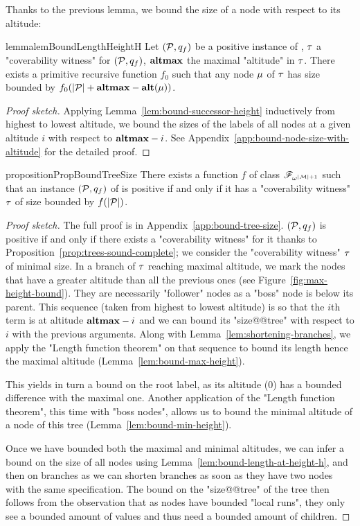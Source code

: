Thanks to the previous lemma, we bound the size of a node with respect to its altitude: 
\begin{restatable}{lemma}{lemBoundLengthHeightH}
	\label{lem:bound-length-at-height-h}
	Let $(\mathcal{P},q_f)$ be a positive instance of \COVER, $\tau$ a "coverability witness" for $(\mathcal{P},q_f)$, $\mathbf{altmax}$ the maximal "altitude" in $\tau$. There exists a primitive recursive function $f_0$ such that any node $\mu$ of $\tau$ has size bounded by $f_0(|\mathcal{P}| + \mathbf{altmax} - \mathbf{alt}(\mu))$.
\end{restatable}
\begin{proof}[Proof sketch]
Applying Lemma~\ref{lem:bound-successor-height} inductively from highest to lowest altitude, we bound the sizes of the labels of all nodes at a given altitude $i$ with respect to $\mathbf{altmax}-i$.
See Appendix~\ref{app:bound-node-size-with-altitude} for the detailed proof. 
\end{proof}
 
\begin{restatable}{proposition}{PropBoundTreeSize}
	\label{prop:bound-tree-size}
	There exists a function $f$ of class $\mathscr{F}_{\omega^{|\mathcal{M}|+1}}$ such that an instance $(\mathcal{P},q_f)$ of \COVER is positive if and only if it has a "coverability witness" $\tau$ of size bounded by $f(|\mathcal{P}|)$.
\end{restatable}

\begin{proof}[Proof sketch]
	The full proof is in Appendix~\ref{app:bound-tree-size}. $(\mathcal{P},q_f)$ is positive if and only if there exists a "coverability witness" for it thanks to Proposition~\ref{prop:trees-sound-complete}; we consider the "coverability witness" $\tau$ of minimal size.
	In a branch of $\tau$ reaching maximal altitude, we mark the nodes that have a greater altitude than all the previous ones (see Figure~\ref{fig:max-height-bound}). They are necessarily "follower" nodes as a "boss" node is below its parent. This sequence (taken from highest to lowest altitude) is so that the $i$th term is at altitude $\mathbf{altmax}-i$ and we can bound its "size@@tree" with respect to $i$ with the previous arguments. Along with Lemma~\ref{lem:shortening-branches}, we apply the "Length function theorem" on that sequence to bound its length hence the maximal altitude (Lemma~\ref{lem:bound-max-height}).
	
	This yields in turn a bound on the root label, as its altitude ($0$) has a bounded difference with the maximal one. Another application of the "Length function theorem", this time with "boss nodes", allows us to bound the minimal altitude of a node of this tree (Lemma~\ref{lem:bound-min-height}).
	
	Once we have bounded both the maximal and minimal altitudes, we can infer a bound on the size of all nodes using Lemma~\ref{lem:bound-length-at-height-h}, and then on branches as we can shorten branches as soon as they have two nodes with the same specification.
	The bound on the "size@@tree" of the tree then follows from the observation that as nodes have bounded "local runs", they only see a bounded amount of values and thus need a bounded amount of children. 
\end{proof}


